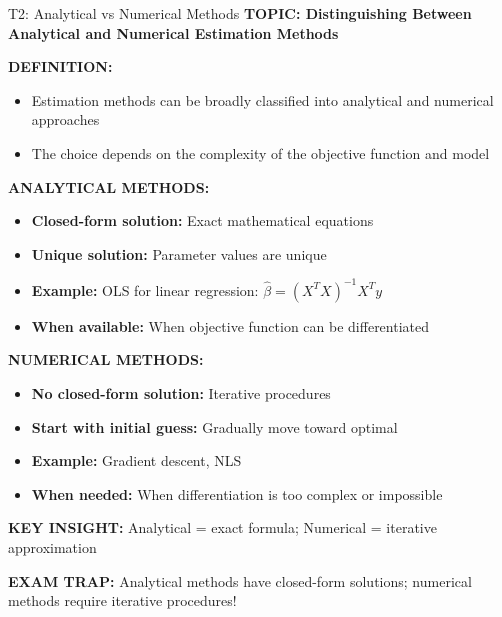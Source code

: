\documentclass[8pt]{beamer}
\begin{document}
	\begin{frame}{T2: Analytical vs Numerical Methods}
		\fontsize{6.5}{7.5}\selectfont
		\textbf{TOPIC: Distinguishing Between Analytical and Numerical Estimation Methods}
		
		\vspace{0.1cm}
		\textbf{DEFINITION:}
		\begin{itemize}
			\item Estimation methods can be broadly classified into analytical and numerical approaches
			\item The choice depends on the complexity of the objective function and model
		\end{itemize}
		
		\vspace{0.1cm}
		\textbf{ANALYTICAL METHODS:}
		\begin{itemize}
			\item \textbf{Closed-form solution:} Exact mathematical equations
			\item \textbf{Unique solution:} Parameter values are unique
			\item \textbf{Example:} OLS for linear regression: $\hat{\beta} = (X^TX)^{-1}X^Ty$
			\item \textbf{When available:} When objective function can be differentiated
		\end{itemize}
		
		\vspace{0.1cm}
		\textbf{NUMERICAL METHODS:}
		\begin{itemize}
			\item \textbf{No closed-form solution:} Iterative procedures
			\item \textbf{Start with initial guess:} Gradually move toward optimal
			\item \textbf{Example:} Gradient descent, NLS
			\item \textbf{When needed:} When differentiation is too complex or impossible
		\end{itemize}
		
		\vspace{0.1cm}
		\textbf{KEY INSIGHT:} Analytical = exact formula; Numerical = iterative approximation
		
		\textcolor{myred}{\textbf{EXAM TRAP:}} Analytical methods have \textcolor{myblue}{closed-form solutions}; numerical methods require \textcolor{myblue}{iterative procedures}!
	\end{frame}
	
\end{document}
